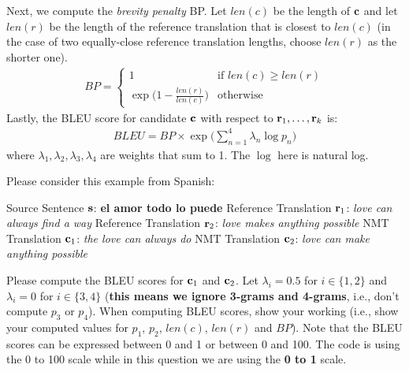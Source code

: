 \begin{parts}
    Next, we compute the \textit{brevity penalty} BP. Let $len(c)$ be the length of $\mathbf{c}$ and let $len(r)$ be the length of the reference translation that is closest to $len(c)$ (in the case of two equally-close reference translation lengths, choose $len(r)$ as the shorter one). 
    \begin{align}
        BP = 
        \begin{cases}
            1 & \text{if } len(c) \ge len(r) \\
            \exp \big( 1 - \frac{len(r)}{len(c)} \big) & \text{otherwise}
        \end{cases}
    \end{align}
    Lastly, the BLEU score for candidate $\mathbf{c}$ with respect to $\mathbf{r}_1,\dots,\mathbf{r}_k$ is:
    \begin{align}
        BLEU = BP \times \exp \Big( \sum_{n=1}^4 \lambda_n \log p_n \Big)
    \end{align}
    where $\lambda_1,\lambda_2,\lambda_3,\lambda_4$ are weights that sum to 1. The $\log$ here is natural log.
    \newline
    \begin{subparts}
        \subpart[5] Please consider this example from Spanish: \newline
        
        Source Sentence $\mathbf{s}$: \textbf{el amor todo lo puede} \newline
        Reference Translation $\mathbf{r}_1$: \textit{love can always find a way} \newline
        Reference Translation $\mathbf{r}_2$: \textit{love makes anything possible} \newline
        NMT Translation $\mathbf{c}_1$: \textit{the love can always do} \newline
        NMT Translation $\mathbf{c}_2$: \textit{love can make anything possible} \newline
        
        Please compute the BLEU scores for $\mathbf{c}_1$ and $\mathbf{c}_2$. Let $\lambda_i=0.5$ for $i\in\{1,2\}$ and $\lambda_i=0$ for $i\in\{3,4\}$ (\textbf{this means we ignore 3-grams and 4-grams}, i.e., don't compute $p_3$ or $p_4$). When computing BLEU scores, show your working (i.e., show your computed values for $p_1$, $p_2$, $len(c)$, $len(r)$ and $BP$). Note that the BLEU scores can be expressed between 0 and 1 or between 0 and 100. The code is using the 0 to 100 scale while in this question we are using the \textbf{0 to 1} scale.
 \newline
        

\end{subparts}
\end{parts}
